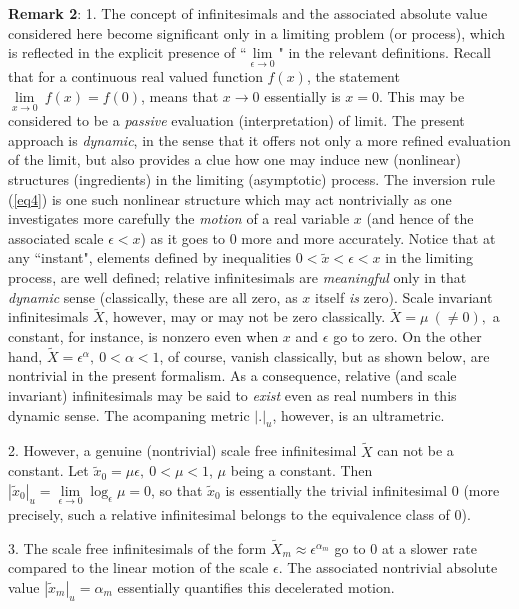 \documentclass[12pt]{article}
\begin{document}
{\bf Remark 2}:
1. The concept of infinitesimals and the associated absolute value considered here become significant only in a limiting problem (or process), which is reflected in the explicit presence of ``$\underset{\epsilon\rightarrow 0}{\lim}$" in the relevant definitions. Recall that for a continuous real valued function $f(x)$, the statement $\underset{x\rightarrow 0}{\lim} \ f(x)=f(0)$, means that ${x\rightarrow 0}$ essentially is $x=0$. This may be considered to be a {\em passive} evaluation (interpretation) of limit. The present approach is {\em dynamic}, in the sense that it offers not only a more refined evaluation of the limit, but also provides a clue how one may induce new (nonlinear) structures (ingredients) in the limiting (asymptotic) process. The inversion rule (\ref{eq4}) is one such nonlinear structure which may act nontrivially as one investigates more carefully the {\em motion} of a real variable $x$ (and hence of the associated scale $\epsilon < x$) as it goes to 0 more and more accurately. Notice that at any ``instant",  elements defined by inequalities $0<\tilde x<\epsilon<x$ in the limiting process, are well defined; relative infinitesimals are {\em meaningful} only in that {\em dynamic} sense (classically, these are all zero, as $x$ itself {\em is } zero). Scale invariant infinitesimals $\tilde X$, however, may or may not be zero classically. $\tilde X=\mu \ (\neq 0), $ a constant,  for instance, is nonzero even when $x$ and $\epsilon$ go to zero. On the other hand, $\tilde X= \epsilon^{\alpha}, \ 0<\alpha<1$, of course, vanish classically, but as shown below, are nontrivial in the present formalism. As a consequence, relative (and scale invariant) infinitesimals may be said to {\em exist} even as real numbers in this dynamic sense. The acompaning metric $|.|_u$, however, is an ultrametric.

2. However, a genuine (nontrivial) scale free  infinitesimal $\tilde X$  can not be a constant. Let $\tilde x_0=\mu\epsilon, \ 0<\mu <1$, $\mu$ being a constant. Then $|\tilde x_0|_u=\underset{\epsilon\rightarrow 0}{\lim} \log _{\epsilon}\mu =0$, so that $\tilde x_0$ is essentially the trivial infinitesimal 0 (more precisely, such a relative infinitesimal belongs to the equivalence class of 0).

3. The scale free infinitesimals of the form $\tilde X_m\approx \epsilon^{\alpha_m}$ go to 0 at a slower rate compared to the linear motion of the scale $\epsilon$. The associated nontrivial  absolute value $|\tilde x_m|_u=\alpha_m$ essentially quantifies this decelerated motion.
\end{document}
